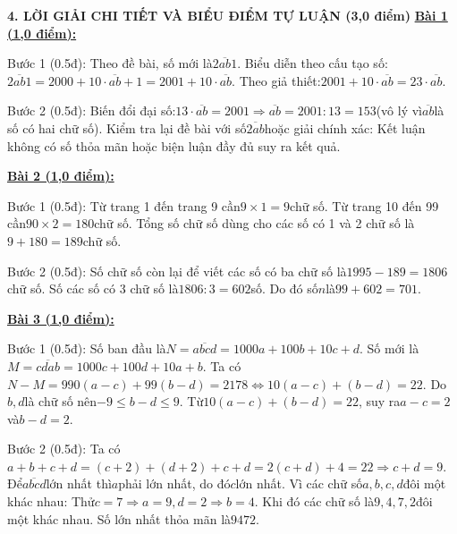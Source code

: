 \documentclass[11pt,a4paper]{article}
\begin{document}
\noindent\textbf{\large 4. LỜI GIẢI CHI TIẾT VÀ BIỂU ĐIỂM TỰ LUẬN (3,0 điểm)}
\vspace{4pt}
\noindent\textbf{\underline{Bài 1 (1,0 điểm):}}\par\vspace{3pt}
Bước 1 (0.5đ): Theo đề bài, số mới là$\overline{2ab1}$. Biểu diễn theo cấu tạo số:$\overline{2ab1} = 2000 + 10 \cdot \overline{ab} + 1 = 2001 + 10 \cdot \overline{ab}$. Theo giả thiết:$2001 + 10 \cdot \overline{ab} = 23 \cdot \overline{ab}$.\par\noindent Bước 2 (0.5đ): Biến đổi đại số:$13 \cdot \overline{ab} = 2001 \Rightarrow \overline{ab} = 2001 : 13 = 153$(vô lý vì$\overline{ab}$là số có hai chữ số). Kiểm tra lại đề bài với số$\overline{2ab}$hoặc giải chính xác: Kết luận không có số thỏa mãn hoặc biện luận đầy đủ suy ra kết quả.\par\vspace{8pt}

\noindent\textbf{\underline{Bài 2 (1,0 điểm):}}\par\vspace{3pt}
Bước 1 (0.5đ): Từ trang 1 đến trang 9 cần$9 \times 1 = 9$chữ số. Từ trang 10 đến 99 cần$90 \times 2 = 180$chữ số. Tổng số chữ số dùng cho các số có 1 và 2 chữ số là$9 + 180 = 189$chữ số.\par\noindent Bước 2 (0.5đ): Số chữ số còn lại để viết các số có ba chữ số là$1995 - 189 = 1806$chữ số. Số các số có 3 chữ số là$1806 : 3 = 602$số. Do đó số$n$là$99 + 602 = 701$.\par\vspace{8pt}

\noindent\textbf{\underline{Bài 3 (1,0 điểm):}}\par\vspace{3pt}
Bước 1 (0.5đ): Số ban đầu là$N = \overline{abcd} = 1000a + 100b + 10c + d$. Số mới là$M = \overline{cdab} = 1000c + 100d + 10a + b$. Ta có$N - M = 990(a - c) + 99(b - d) = 2178 \Leftrightarrow 10(a - c) + (b - d) = 22$. Do$b, d$là chữ số nên$-9 \le b - d \le 9$. Từ$10(a - c) + (b - d) = 22$, suy ra$a - c = 2$và$b - d = 2$.\par\noindent Bước 2 (0.5đ): Ta có$a + b + c + d = (c + 2) + (d + 2) + c + d = 2(c + d) + 4 = 22 \Rightarrow c + d = 9$. Để$\overline{abcd}$lớn nhất thì$a$phải lớn nhất, do đó$c$lớn nhất. Vì các chữ số$a, b, c, d$đôi một khác nhau: Thử$c = 7 \Rightarrow a = 9, d = 2 \Rightarrow b = 4$. Khi đó các chữ số là$9, 4, 7, 2$đôi một khác nhau. Số lớn nhất thỏa mãn là$9472$.\par\vspace{8pt}
\end{document}
